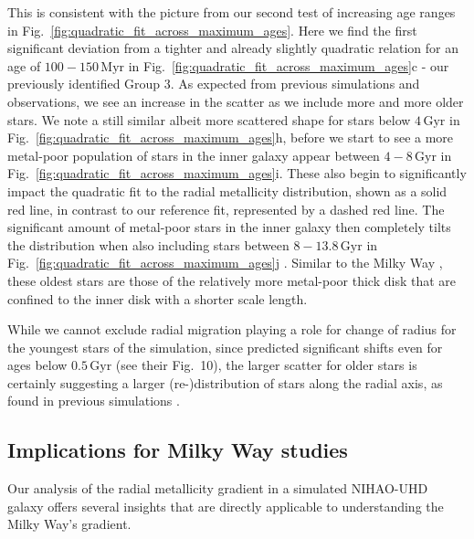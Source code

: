 \documentclass[twocolumn,apj,numberedappendix,appendixfloats,twocolappendix]{openjournal}
\begin{document}
\begin{CJK*}{UTF8}{gbsn}
This is consistent with the picture from our second test of increasing age ranges in Fig.~\ref{fig:quadratic_fit_across_maximum_ages}. Here we find the first significant deviation from a tighter and already slightly quadratic relation for an age of $100-150\,\mathrm{Myr}$ in Fig.~\ref{fig:quadratic_fit_across_maximum_ages}c - our previously identified Group 3. As expected from previous simulations and observations, we see an increase in the scatter as we include more and more older stars. We note a still similar albeit more scattered shape for stars below $4\,\mathrm{Gyr}$ in  Fig.~\ref{fig:quadratic_fit_across_maximum_ages}h, before we start to see a more metal-poor population of stars in the inner galaxy appear between $4-8\,\mathrm{Gyr}$ in  Fig.~\ref{fig:quadratic_fit_across_maximum_ages}i. These also begin to significantly impact the quadratic fit to the radial metallicity distribution, shown as a solid red line, in contrast to our reference fit, represented by a dashed red line. The significant amount of metal-poor stars in the inner galaxy then completely tilts the distribution when also including stars between $8-13.8\,\mathrm{Gyr}$ in Fig.~\ref{fig:quadratic_fit_across_maximum_ages}j \citep[see also][]{Johnson2024}. Similar to the Milky Way \citep{BlandHawthorn_Gerhard2016}, these oldest stars are those of the relatively more metal-poor thick disk that are confined to the inner disk with a shorter scale length.

While we cannot exclude radial migration playing a role for change of radius for the youngest stars of the simulation, since \citet{Frankel2018} predicted significant shifts even for ages below $0.5\,\mathrm{Gyr}$ (see their Fig.~10), the larger scatter for older stars is certainly suggesting a larger (re-)distribution of stars along the radial axis, as found in previous simulations \citep{Minchev2010, Grand2015}.

\subsection{Implications for Milky Way studies} \label{sec:implications_milky_way}

Our analysis of the radial metallicity gradient in a simulated NIHAO-UHD galaxy offers several insights that are directly applicable to understanding the Milky Way's gradient.


\end{CJK*}
\end{document}
